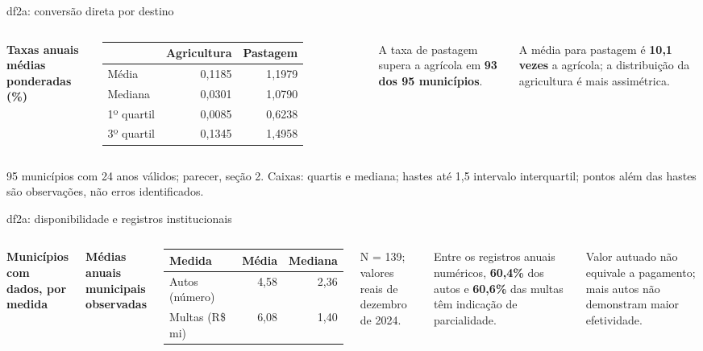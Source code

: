\documentclass[aspectratio=169,11pt]{beamer}
\newcommand{\fonte}[1]{\par\vfill{\fontsize{7.5}{9}\selectfont\color{gray}#1\par}}
\newcommand{\tpar}{\par\vspace{2mm}}
\begin{document}
\begin{frame}{df2a: conversão direta por destino}
\begin{columns}[T,onlytextwidth]

\small\textbf{Taxas anuais médias ponderadas (\%)}\par\smallskip
\begin{tabularx}{\linewidth}{L r r}
\toprule
 & \textbf{Agricultura} & \textbf{Pastagem}\\
\midrule
Média & 0,1185 & 1,1979\\
Mediana & 0,0301 & 1,0790\\
1º quartil & 0,0085 & 0,6238\\
3º quartil & 0,1345 & 1,4958\\
\bottomrule
\end{tabularx}\par
\medskip
A taxa de pastagem supera a agrícola em \textbf{93 dos 95 municípios}.
\tpar
A média para pastagem é \textbf{10,1 vezes} a agrícola; a distribuição da agricultura é mais assimétrica.
\end{columns}
\fonte{95 municípios com 24 anos válidos; parecer, seção 2. Caixas: quartis e mediana; hastes até 1,5 intervalo interquartil; pontos além das hastes são observações, não erros identificados.}
\end{frame}

\begin{frame}{df2a: disponibilidade e registros institucionais}
\begin{columns}[T,onlytextwidth]
\small\textbf{Municípios com dados, por medida}\par\smallskip
{\def\LarguraGrafico{.94\linewidth}}
\small\textbf{Médias anuais municipais observadas}\par\smallskip
\begin{tabularx}{\linewidth}{L r r}
\toprule
\textbf{Medida} & \textbf{Média} & \textbf{Mediana}\\
\midrule
Autos (número) & 4,58 & 2,36\\
Multas (R\$ mi) & 6,08 & 1,40\\
\bottomrule
\end{tabularx}\par
\smallskip
\footnotesize N = 139; valores reais de dezembro de 2024.\par
\medskip\small
Entre os registros anuais numéricos, \textbf{60,4\%} dos autos e \textbf{60,6\%} das multas têm indicação de parcialidade.
\tpar
Valor autuado não equivale a pagamento; mais autos não demonstram maior efetividade.
\end{columns}
\end{frame}
\end{document}

